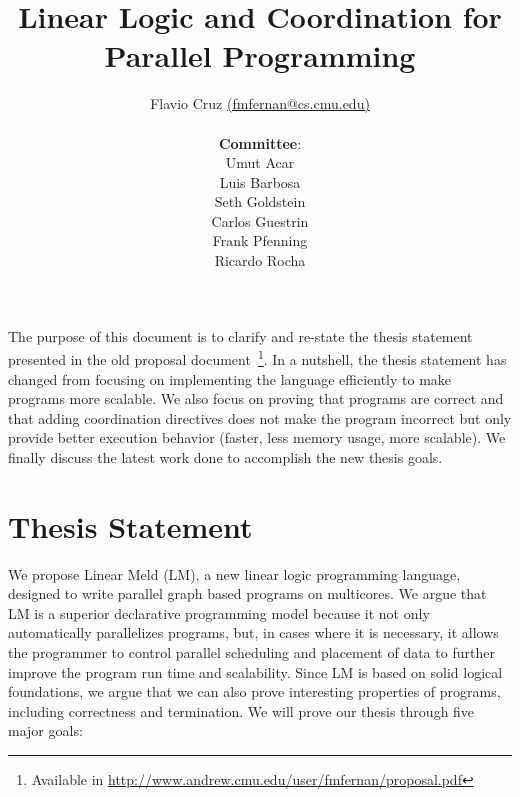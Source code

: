 \documentclass[10pt]{article}
\title{Linear Logic and Coordination for Parallel Programming}
\author{Flavio Cruz \href{mailto:fmfernan@cs.cmu.edu}{(fmfernan@cs.cmu.edu)} \\\\
\textbf{Committee}: \\
Umut Acar\\
Luis Barbosa\\
Seth Goldstein\\
Carlos Guestrin\\
Frank Pfenning\\
Ricardo Rocha\\
}
\begin{document}
\maketitle

The purpose of this document is to clarify and re-state the thesis statement
presented in the old proposal document~\footnote{Available in
\url{http://www.andrew.cmu.edu/user/fmfernan/proposal.pdf}}.
In a nutshell, the thesis statement has changed from focusing on implementing the
language efficiently to make programs more scalable. We also focus on proving that programs
are correct and that adding coordination directives does not
make the program incorrect but only provide better execution behavior (faster,
      less memory usage, more scalable).
We finally discuss the latest work done to accomplish the new thesis goals.

\section{Thesis Statement}

We propose Linear Meld (LM), a new linear logic programming language, designed
to write parallel graph based programs on multicores.  We argue that LM is a
superior declarative programming model because it not only automatically
parallelizes programs, but, in cases where it is necessary, it allows the
programmer to control parallel scheduling and placement of data to further
improve the program run time and scalability.  Since LM is based on solid
logical foundations, we argue that we can also prove interesting properties of
programs, including correctness and termination. We will prove our thesis
through five major goals:
\end{document}
